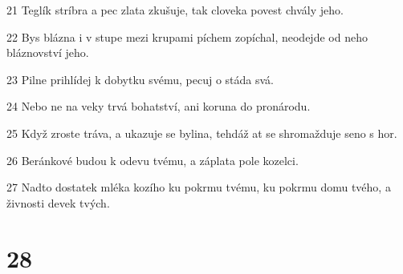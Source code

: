 \par 21 Teglík stríbra a pec zlata zkušuje, tak cloveka povest chvály jeho.
\par 22 Bys blázna i v stupe mezi krupami píchem zopíchal, neodejde od neho bláznovství jeho.
\par 23 Pilne prihlídej k dobytku svému, pecuj o stáda svá.
\par 24 Nebo ne na veky trvá bohatství, ani koruna do pronárodu.
\par 25 Když zroste tráva, a ukazuje se bylina, tehdáž at se shromažduje seno s hor.
\par 26 Beránkové budou k odevu tvému, a záplata pole kozelci.
\par 27 Nadto dostatek mléka kozího ku pokrmu tvému, ku pokrmu domu tvého, a živnosti devek tvých.

\chapter{28}

